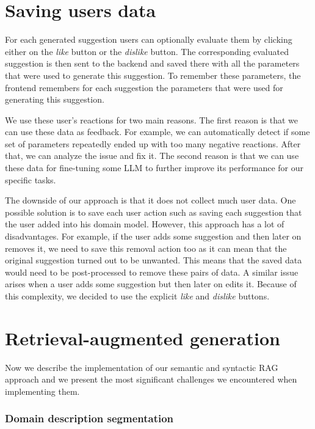 

\section{Saving users data}

For each generated suggestion users can optionally evaluate them by clicking either on the \emph{like} button or the \emph{dislike} button. The corresponding evaluated suggestion is then sent to the backend and saved there with all the parameters that were used to generate this suggestion. To remember these parameters, the frontend remembers for each suggestion the parameters that were used for generating this suggestion.

We use these user's reactions for two main reasons. The first reason is that we can use these data as feedback. For example, we can automatically detect if some set of parameters repeatedly ended up with too many negative reactions. After that, we can analyze the issue and fix it. The second reason is that we can use these data for fine-tuning some LLM to further improve its performance for our specific tasks.

The downside of our approach is that it does not collect much user data. One possible solution is to save each user action such as saving each suggestion that the user added into his domain model. However, this approach has a lot of disadvantages. For example, if the user adds some suggestion and then later on removes it, we need to save this removal action too as it can mean that the original suggestion turned out to be unwanted. This means that the saved data would need to be post-processed to remove these pairs of data. A similar issue arises when a user adds some suggestion but then later on edits it. Because of this complexity, we decided to use the explicit \emph{like} and \emph{dislike} buttons.


\section{Retrieval-augmented generation}
\label{sec:rag_implementation}

Now we describe the implementation of our semantic and syntactic RAG approach and we present the most significant challenges we encountered when implementing them.


\subsubsection{Domain description segmentation}

